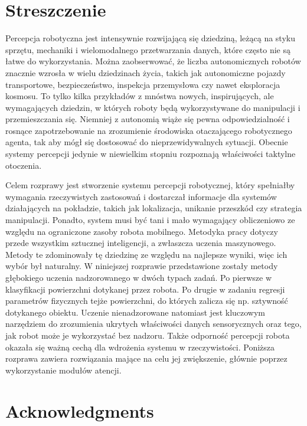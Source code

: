 \documentclass[a4paper, 10pt, twoside]{report}
\begin{document}
\chapter*{Streszczenie}
\label{sec:streszczenie}

\begin{otherlanguage}{polish}
Percepcja robotyczna jest intensywnie rozwijającą się dziedziną, leżącą na styku sprzętu, mechaniki i wielomodalnego przetwarzania danych, które często nie są łatwe do wykorzystania. Można zaobserwować, że liczba autonomicznych robotów znacznie wzrosła w wielu dziedzinach życia, takich jak autonomiczne pojazdy transportowe, bezpieczeństwo, inspekcja przemysłowa czy nawet eksploracja kosmosu. To tylko kilka przykładów z mnóstwa nowych, inspirujących, ale wymagających dziedzin, w których roboty będą wykorzystywane do manipulacji i przemieszczania się. Niemniej z autonomią wiąże się pewna odpowiedzialność i rosnące zapotrzebowanie na zrozumienie środowiska otaczającego robotycznego agenta, tak aby mógł się dostosować do {nieprzewidywalnych} sytuacji. Obecnie systemy percepcji jedynie w niewielkim stopniu rozpoznają właściwości taktylne otoczenia. 

Celem rozprawy jest stworzenie systemu percepcji robotycznej, który spełniałby wymagania rzeczywistych zastosowań i dostarczał informacje dla systemów działających na pokładzie, takich jak lokalizacja, unikanie przeszkód czy strategia manipulacji. Ponadto, system musi być tani i mało wymagający obliczeniowo ze względu na ograniczone zasoby robota mobilnego. Metodyka pracy dotyczy przede wszystkim sztucznej inteligencji, a zwłaszcza uczenia maszynowego. Metody te zdominowały tę dziedzinę ze względu na najlepsze wyniki, więc ich wybór był naturalny. W niniejszej rozprawie przedstawione zostały metody głębokiego uczenia nadzorowanego w dwóch typach zadań. Po pierwsze w klasyfikacji powierzchni dotykanej przez robota. Po drugie w zadaniu regresji parametrów fizycznych tejże powierzchni, do których zalicza się np. sztywność dotykanego obiektu. Uczenie nienadzorowane natomiast jest kluczowym narzędziem do zrozumienia ukrytych właściwości danych sensorycznych oraz tego, jak robot może je wykorzystać bez nadzoru. Także odporność percepcji robota okazała się ważną cechą dla wdrożenia systemu w rzeczywistości. Poniższa rozprawa zawiera rozwiązania mające na celu jej zwiększenie, głównie poprzez wykorzystanie modułów atencji.
\end{otherlanguage}

\chapter*{Acknowledgments}
\label{sec:acknowledgements}
\end{document}

